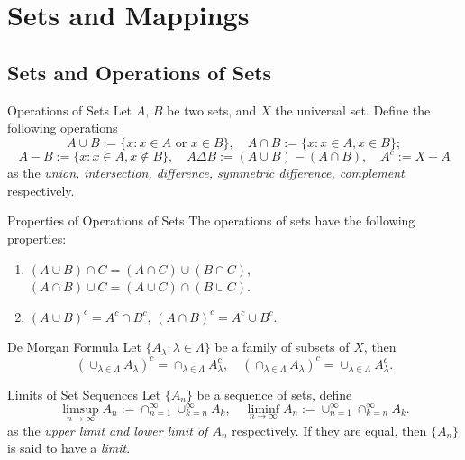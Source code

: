 
\section{Sets and Mappings}

\subsection{Sets and Operations of Sets}

\begin{definition}{Operations of Sets}{}
  Let $A$, $B$ be two sets,
  and $X$ the universal set.
  Define the following operations
  \begin{equation}
    A \cup B := \{x: x \in A \text{ or } x \in B\}, \quad
    A \cap B := \{x: x \in A, x \in B\};
  \end{equation}
  \begin{equation}
    A - B := \{x: x \in A, x \not\in B\}, \quad
    A \Delta B := (A \cup B) - (A \cap B), \quad
    A^c := X - A
  \end{equation}
  as the \emph{union, intersection, difference, symmetric difference, complement} respectively.
\end{definition}

\begin{proposition}{Properties of Operations of Sets}{}
  The operations of sets have the following properties:
  \begin{enumerate}
  \item $(A \cup B)\cap C = (A \cap C) \cup (B \cap C)$,
    $(A \cap B) \cup C = (A \cup C) \cap (B \cup C)$.
  \item $(A\cup B)^c = A^c \cap B^c$, $(A \cap B)^c = A^c \cup B^c$.
  \end{enumerate}
\end{proposition}

\begin{theorem}{De Morgan Formula}{}
  Let $\{A_{\lambda}: \lambda \in \Lambda\}$ be a family of subsets of $X$, then
  \begin{equation}
    \left(\cup_{\lambda\in\Lambda}A_{\lambda}\right)^{c}=\cap_{\lambda\in\Lambda}A_{\lambda}^{c},\quad\left(\cap_{\lambda\in\Lambda}A_{\lambda}\right)^{c}=\cup_{\lambda\in\Lambda}A_{\lambda}^{c}.
  \end{equation}
\end{theorem}

\begin{definition}{Limits of Set Sequences}{}
  Let $\{A_n\}$ be a sequence of sets,
  define
  \begin{equation}
    \limsup \limits_{n \rightarrow \infty} A_n := \cap _{n = 1}^{\infty}
    \cup _{k = n} ^{\infty} A_k, \quad
    \liminf \limits_{n \rightarrow \infty} A_n := \cup _{n = 1}^{\infty}
    \cap _{k = n}^{\infty}A_k.
  \end{equation}
  as the \emph{upper limit and lower limit of $A_n$} respectively.
  If they are equal, then $\{A_n\}$ is said to have a \emph{limit}.
\end{definition}

